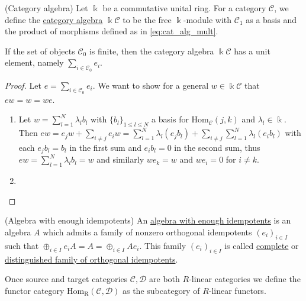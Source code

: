 \begin{definition}{(Category algebra)}
Let $\Bbbk$ be a commutative unital ring. For a category $\mathcal{C}$, we define the \ul{category algebra} $\Bbbk \mathcal{C}$
to be the free $\Bbbk$-module with $\mathcal{C}_{1}$ as a basis and the product of morphisms defined as in \eqref{eq:cat_alg_mult}.
\end{definition}

\begin{lemma}
If the set of objects $\mathcal{C}_{0}$ is finite, then the category algebra $\Bbbk\mathcal{C}$ has a unit element, namely
$\sum_{i\in \mathcal{C}_{0}} e_{i}$.
\end{lemma}
\begin{proof}
Let $e = \sum_{i\in \mathcal{C}_{0}} e_{i}$. We want to show for a general $w \in \Bbbk\mathcal{C}$ that $ew = w = we$.
\begin{enumerate}
\item Let $w = \sum_{l=1}^{N} \lambda_{l} b_{l}$ with $\{b_{l}\}_{1\leq l\leq N}$ a basis for $\mathrm{Hom}_{\mathcal{C}}(j,k)$ and
$\lambda_{l} \in \Bbbk$. Then $ew = e_{j}w + \sum_{i \neq j} e_{i} w = \sum_{l=1}^{N} \lambda_{l} (e_{j} b_{l})
+ \sum_{i \neq j} \sum_{l=1}^{N} \lambda_{l} (e_{i} b_{l})$ with each $e_{j} b_{l} = b_{l}$ in the first sum and
$e_{i} b_{l} = 0$ in the second sum, thus $ew = \sum_{l=1}^{N} \lambda_{l} b_{l} = w$ and similarly $we_{k} = w$ and $we_{i} = 0$ for
$i \neq k$.
\item 
\end{enumerate}
\end{proof}

\begin{definition}{(Algebra with enough idempotents)}
An \ul{algebra with enough idempotents} is an algebra $A$ which admits a family of nonzero orthogonal idempotents
$(e_{i})_{i\in I}$ such that $\oplus_{i\in I} e_{i} A = A = \oplus_{i\in I} Ae_{i}$.
This family $(e_{i})_{i\in I}$ is called \ul{complete} or \ul{distinguished family of orthogonal idempotents}.
\end{definition}



\begin{definition}
Once source and target categories $\mathcal{C}, \mathcal{D}$ are both $R$-linear categories we define the functor category
$\mathrm{Hom_{R}}(\mathcal{C},\mathcal{D})$ as the subcategory of $R$-linear functors.
\end{definition}



